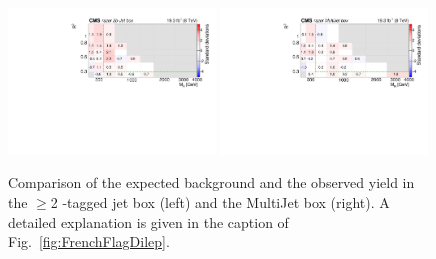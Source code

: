 \begin{figure}[tb!]
\centering
\includegraphics[width=0.49\textwidth]{figs/analysis8TeV/nSigmaLog_Jet2b.pdf}
\includegraphics[width=0.49\textwidth]{figs/analysis8TeV/nSigmaLog_MultiJetFITS.pdf}
\caption{Comparison of the expected background and the observed yield
  in the $\geq$2 \PQb-tagged jet box (left) and the MultiJet box
  (right). A detailed explanation is given in the caption of
  Fig.~\ref{fig:FrenchFlagDilep}.\label{fig:FrenchFlagHad}}

\end{figure}


